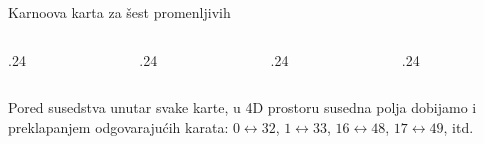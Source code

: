 \begin{frame}[label=02-s038]{Karnoova karta za šest promenljivih}
\setlength{\parskip}{0pt}
\begin{columns}[T,onlytextwidth]
\begin{column}{.24\textwidth}\centering
{}\par\vspace{1mm}

\end{column}
\begin{column}{.24\textwidth}\centering
{}\par\vspace{1mm}

\end{column}
\begin{column}{.24\textwidth}\centering
{}\par\vspace{1mm}

\end{column}
\begin{column}{.24\textwidth}\centering
{}\par\vspace{1mm}

\end{column}
\end{columns}
\par\vspace{3mm}
Pored susedstva unutar svake karte, u 4D prostoru susedna polja dobijamo i preklapanjem odgovarajućih karata: \(0\leftrightarrow32\), \(1\leftrightarrow33\), \(16\leftrightarrow48\), \(17\leftrightarrow49\), itd.
\end{frame}
